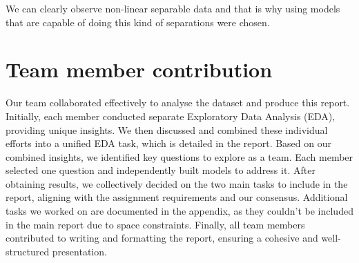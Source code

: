 \documentclass{article}
\begin{document}
We can clearly observe non-linear separable data and that is why using models that are capable of doing this kind of separations were chosen.

\section{Team member contribution}
Our team collaborated effectively to analyse the dataset and produce this report. Initially, each member conducted separate Exploratory Data Analysis (EDA), providing unique insights. We then discussed and combined these individual efforts into a unified EDA task, which is detailed in the report. Based on our combined insights, we identified key questions to explore as a team. Each member selected one question and independently built models to address it. After obtaining results, we collectively decided on the two main tasks to include in the report, aligning with the assignment requirements and our consensus. Additional tasks we worked on are documented in the appendix, as they couldn't be included in the main report due to space constraints. Finally, all team members contributed to writing and formatting the report, ensuring a cohesive and well-structured presentation.
\end{document}

